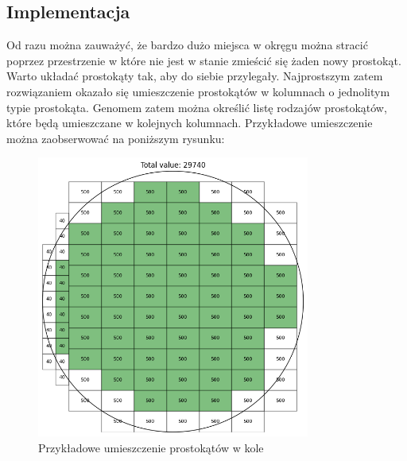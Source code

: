 \documentclass{article}
\begin{document}
\subsection*{Implementacja}
Od razu można zauważyć, że bardzo dużo miejsca w okręgu można stracić poprzez przestrzenie w które nie jest w stanie zmieścić się żaden nowy prostokąt. Warto układać prostokąty tak, aby do siebie przylegały. Najprostszym zatem rozwiązaniem okazało się umieszczenie prostokątów w kolumnach o jednolitym typie prostokąta. Genomem zatem można określić listę rodzajów prostokątów, które będą umieszczane w kolejnych kolumnach.
Przykładowe umieszczenie można zaobserwować na poniższym rysunku:
\begin{figure}[H]
    \centering
    \includegraphics[width=0.8\textwidth]{img/ae2/rectangles_example.png}
    \caption{Przykładowe umieszczenie prostokątów w kole}
\end{figure}
\end{document}
